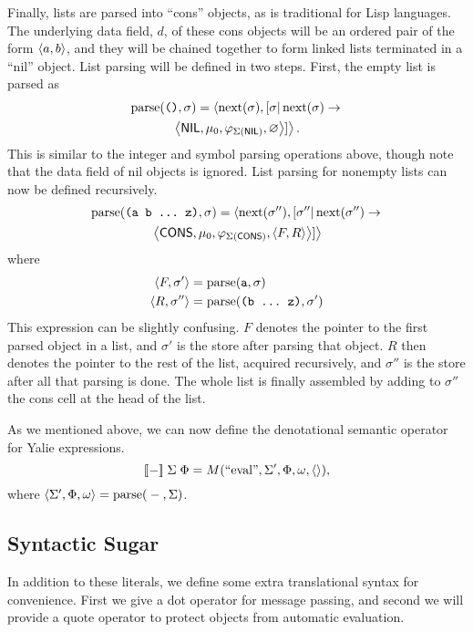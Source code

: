 \documentclass[twocolumn]{article}
\begin{document}
Finally, lists are parsed into ``cons'' objects, as is traditional for
Lisp languages. The underlying data field, $d$, of these cons objects
will be an ordered pair of the form $\left< a,b\right>$, and they will be
chained together to form linked lists terminated in a ``nil''
object. List parsing will be defined in two steps. First, the empty
list is parsed as
\begin{multline*}
  \operatorname{parse}(\texttt{()},\sigma) = \left<\operatorname{next}(\sigma),
  [\sigma|\operatorname{next}(\sigma) \rightarrow \right.\\
\left.\left<\mathsf{NIL}, \mu_0, \varphi_{\Sigma(\mathsf{NIL})}, \varnothing\right>]\right>.
\end{multline*}
This is similar to the integer and symbol parsing operations above,
though note that the data field of nil objects is ignored. List
parsing for nonempty lists can now be defined recursively.
\begin{multline*} \operatorname{parse}(\texttt{(a b \ldots\ z)},\sigma) = \left<
  \operatorname{next}(\sigma''),[\sigma''|\operatorname{next}(\sigma'')
  \rightarrow\right. \\\left.\left<\mathsf{CONS}, \mu_0,
  \varphi_{\Sigma(\mathsf{CONS})},
  \left< F, R \right> \right> ] \right>
\end{multline*}
where
\begin{align*}
  \left< F, \sigma' \right> &= \operatorname{parse}( \texttt{a}, \sigma ) \\
  \left< R, \sigma'' \right> &= \operatorname{parse}( \texttt{(b \ldots\ z)}, \sigma')
\end{align*}
This expression can be slightly confusing. $F$ denotes the pointer to
the first parsed object in a list, and $\sigma'$ is the store after
parsing that object. $R$ then denotes the pointer to the rest of the
list, acquired recursively, and $\sigma''$ is the store after all that
parsing is done. The whole list is finally assembled by adding to
$\sigma''$ the cons cell at the head of the list.

As we mentioned above, we can now define the denotational semantic
operator for Yalie expressions.
\[ [\![-]\!]\phantom{,}\Sigma\phantom{,}\Phi = M(\text{``eval''}, \Sigma',
\Phi, \omega, \left<\right>),\] where $\left< \Sigma', \Phi, \omega\right>
= \operatorname{parse}({}-{},\Sigma)$.

\subsection*{Syntactic Sugar}
In addition to these literals, we define some extra translational
syntax for convenience. First we give a dot operator for message
passing, and second we will provide a quote operator to protect
objects from automatic evaluation.
\end{document}
